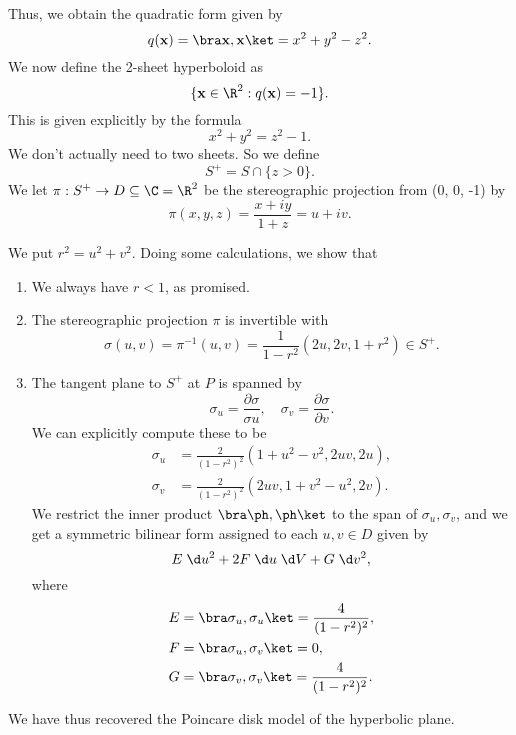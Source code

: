 \documentclass[a4paper]{article}
\begin{document}
Thus, we obtain the quadratic form given by
\[
  q(\mathbf{x}) = \bra \mathbf{x}, \mathbf{x}\ket = x^2 + y^2 - z^2.
\]
We now define the 2-sheet hyperboloid as
\[
  \{\mathbf{x} \in \R^2: q(\mathbf{x}) = -1\}.
\]
This is given explicitly by the formula
\[
  x^2 + y^2 = z^2 - 1.
\]
We don't actually need to two sheets. So we define
\[
  S^+ = S \cap \{z > 0\}.
\]
We let $\pi: S^+ \to D \subseteq \C = \R^2$ be the stereographic projection from (0, 0, -1) by
\[
  \pi(x, y, z) = \frac{x + iy}{1 + z} = u + iv.
\]
\begin{center}
\end{center}
We put $r^2 = u^2 + v^2$. Doing some calculations, we show that
\begin{enumerate}
  \item We always have $r < 1$, as promised.
  \item The stereographic projection $\pi$ is invertible with
    \[
      \sigma(u, v) = \pi^{-1}(u, v) = \frac{1}{1 - r^2}(2u, 2v, 1 + r^2) \in S^+.
    \]
  \item The tangent plane to $S^+$ at $P$ is spanned by
    \[
      \sigma_u = \frac{\partial \sigma}{\sigma u},\quad \sigma_v = \frac{\partial \sigma}{\partial v}.
    \]
    We can explicitly compute these to be
    \begin{align*}
      \sigma_u &= \frac{2}{(1 - r^2)^2} (1 + u^2 - v^2, 2uv, 2u),\\
      \sigma_v &= \frac{2}{(1 - r^2)^2} (2uv, 1 + v^2 - u^2, 2v).
    \end{align*}
    We restrict the inner product $\bra \ph, \ph \ket$ to the span of $\sigma_u, \sigma_v$, and we get a symmetric bilinear form assigned to each $u, v \in D$ given by
    \[
      E\;\d u^2 + 2F \;\d u\;\d V + G \;\d v^2,
    \]
    where
    \begin{align*}
      E &= \bra \sigma_u, \sigma_u\ket = \frac{4}{(1 - r^2)^2},\\
      F &= \bra \sigma_u, \sigma_v\ket = 0,\\
      G &= \bra \sigma_v, \sigma_v\ket = \frac{4}{(1 - r^2)^2}.
    \end{align*}
\end{enumerate}
We have thus recovered the Poincare disk model of the hyperbolic plane.
\end{document}
